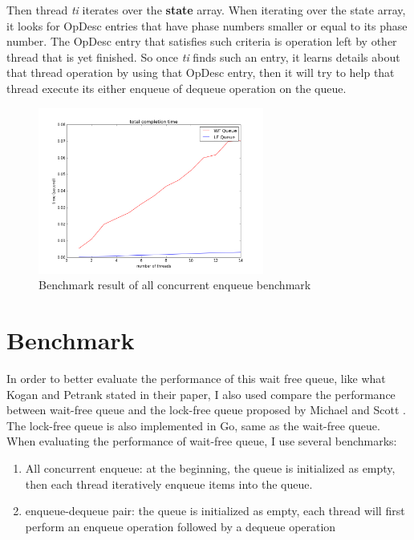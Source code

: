 \documentclass[a4paper]{article}
\begin{document}
Then thread \textit{ti} iterates over the \textbf{state} array. When iterating over the state array, it looks for OpDesc entries that have phase numbers smaller or equal to its phase number. The OpDesc entry that satisfies such criteria is operation left by other thread that is yet finished. So once \textit{ti} finds such an entry, it learns details about that thread operation by using that OpDesc entry, then it will try to help that thread execute its either enqueue of dequeue operation on the queue. 

\begin{figure}
\centering
\includegraphics[width=0.66\textwidth]{benchmark1.png}
\caption{\label{fig:benchmark1}Benchmark result of all concurrent enqueue benchmark}
\end{figure}

\section{Benchmark}

In order to better evaluate the performance of this wait free queue, like what Kogan and Petrank stated in their paper, I also used compare the performance between wait-free queue and the lock-free queue proposed by Michael and Scott \cite{2}. The lock-free queue is also implemented in Go, same as the wait-free queue.
When evaluating the performance of wait-free queue, I use several benchmarks:
\begin{enumerate}
\item All concurrent enqueue: at the beginning, the queue is initialized as empty, then each thread iteratively enqueue items into the queue.
\item enqueue-dequeue pair: the queue is initialized as empty, each thread will first perform an enqueue operation followed by a dequeue operation
\end{enumerate}
\end{document}
